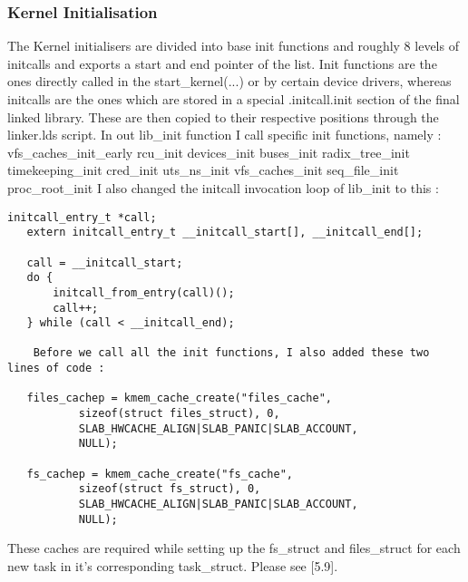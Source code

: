 \documentclass{sig-alternate}
\begin{document}
\subsubsection{Kernel Initialisation}
The Kernel initialisers are divided into base init functions and roughly 8 levels of initcalls and exports a start and end pointer of the list. 
Init functions are the ones directly called in the start\_kernel(...) or by certain device drivers, whereas initcalls are the ones which are stored 
in a special .initcall.init section of the final linked library. These are then copied to their respective positions through the linker.lds script.
In out lib\_init function I call specific init functions, namely : 
vfs\_caches\_init\_early
rcu\_init
devices\_init 
buses\_init
radix\_tree\_init
timekeeping\_init
cred\_init
uts\_ns\_init 
vfs\_caches\_init 
seq\_file\_init 
proc\_root\_init
I also changed the initcall invocation loop of lib\_init to this : 
\begin{lstlisting}[style=CStyle] 
   initcall_entry_t *call;
   extern initcall_entry_t __initcall_start[], __initcall_end[];
 
   call = __initcall_start;
   do {               
       initcall_from_entry(call)();               
       call++;
   } while (call < __initcall_end);

	Before we call all the init functions, I also added these two lines of code :

   files_cachep = kmem_cache_create("files_cache",
           sizeof(struct files_struct), 0,
           SLAB_HWCACHE_ALIGN|SLAB_PANIC|SLAB_ACCOUNT,
           NULL);
 
   fs_cachep = kmem_cache_create("fs_cache",
           sizeof(struct fs_struct), 0,
           SLAB_HWCACHE_ALIGN|SLAB_PANIC|SLAB_ACCOUNT,
           NULL);
\end{lstlisting}
	These caches are required while setting up the fs\_struct and files\_struct for each new task in it’s corresponding task\_struct. Please see [5.9].
\end{document}
